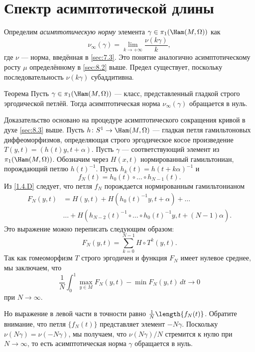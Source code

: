 \section{Спектр асимптотической длины}

Определим \emph{асимптотическую норму} элемента $\gamma\in\pi_1(\Ham(M, \Omega))$ как
\[\nu_\infty(\gamma)=\lim_{k\to+\infty}\frac{\nu(k\gamma)}{k},\]
где $\nu$ --- норма, введённая в \ref{sec:7.3}. 
Это понятие аналогично асимптотическому росту $\mu$ определённому в \ref{sec:8.2} выше.
Предел существует, поскольку последовательность $\nu(k\gamma)$ субаддитивна.

\begin{thm}{Теорема}\label{11.2.A}
Пусть $\gamma\in\pi_1(\Ham(M,\Omega))$ --- класс, представленный гладкой строго эргодической петлёй.
Тогда асимптотическая норма $\nu_\infty ​​(\gamma)$ обращается в нуль.
\end{thm}

Доказательство основано на процедуре асимптотического сокращения кривой в духе \ref{sec:8.3} выше.
Пусть $h\: S^1 \to \Ham(M,\Omega)$ --- гладкая петля гамильтоновых диффеоморфизмов, определяющая строго эргодическое косое произведение $T(y, t) = (h(t)y, t+\alpha)$.
Пусть $\gamma$ --- соответствующий элемент из $\pi_1(\Ham(M, \Omega))$.
Обозначим через $H(x, t)$ нормированный гамильтониан, порождающий петлю $h(t)^{-1}$.
Пусть $h_k(t) = h(t + k\alpha)^{-1}$ и  
\[f_N(t) = h_0(t) \circ \dots \circ h_{N-1}(t).\]
Из \ref{1.4.D} следует, что петля $f_N$ порождается нормированным гамильтонианом 
\begin{align*}
F_N(y,t)
&=
H(y,t)
+ H(h_0(t)^{-1}y,t+\alpha)
+\dots
\\
&\dots
+
H(h_{N-2} (t)^{-1} \circ \dots\circ h_0(t)^{-1}y, t + (N - 1)\alpha).
\end{align*}
Это выражение можно переписать следующим образом:
\[F_N(y, t) = \sum_{k=0}^{N-1} H\circ T^k(y, t).\]
Так как гомеоморфизм $T$ строго эргодичен и функция $F_N$ имеет нулевое среднее, мы заключаем, что
\[\frac1N\int_0^1\max_{y\in M}F_N(y, t) - \min F_N(y, t)\,dt \to 0\]
при $N \to \infty$.

Но выражение в левой части в точности равно $\frac1N\length\{f_N(t)\}$.
Обратите внимание, что петля $\{f_N(t)\}$ представляет элемент $-N\gamma$.
Поскольку $\nu(N\gamma) = \nu(-N\gamma)$, мы получаем, что $\nu(N\gamma)/N$ стремится к нулю при $N \to \infty$,
то есть асимптотическая норма $\gamma$ обращается в нуль.
\qeds

